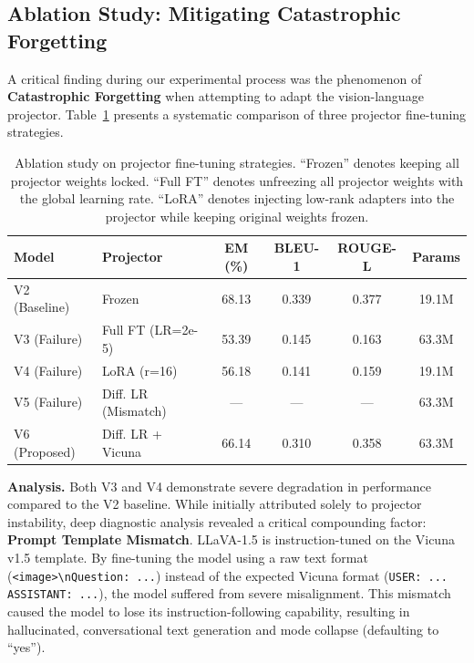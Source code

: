 \subsection{Ablation Study: Mitigating Catastrophic Forgetting}

A critical finding during our experimental process was the phenomenon of \textbf{Catastrophic Forgetting} when attempting to adapt the vision-language projector. Table~\ref{tab:ablation} presents a systematic comparison of three projector fine-tuning strategies.

\begin{table}[htbp]
\caption{Ablation study on projector fine-tuning strategies. ``Frozen'' denotes keeping all projector weights locked. ``Full FT'' denotes unfreezing all projector weights with the global learning rate. ``LoRA'' denotes injecting low-rank adapters into the projector while keeping original weights frozen.}
\label{tab:ablation}
\centering
\begin{tabular}{llcccc}
\toprule
\textbf{Model} & \textbf{Projector} & \textbf{EM (\%)} & \textbf{BLEU-1} & \textbf{ROUGE-L} & \textbf{Params} \\
\midrule
V2 (Baseline)  & Frozen             & 68.13 & 0.339 & 0.377 & 19.1M \\
V3 (Failure)   & Full FT (LR=2e-5)  & 53.39 & 0.145 & 0.163 & 63.3M \\
V4 (Failure)   & LoRA (r=16)        & 56.18 & 0.141 & 0.159 & 19.1M \\
V5 (Failure)   & Diff. LR (Mismatch)& ---   & ---   & ---   & 63.3M \\
V6 (Proposed)  & Diff. LR + Vicuna  & 66.14 & 0.310 & 0.358 & 63.3M \\
\bottomrule
\end{tabular}
\end{table}

\textbf{Analysis.} Both V3 and V4 demonstrate severe degradation in performance compared to the V2 baseline. While initially attributed solely to projector instability, deep diagnostic analysis revealed a critical compounding factor: \textbf{Prompt Template Mismatch}. LLaVA-1.5 is instruction-tuned on the Vicuna v1.5 template. By fine-tuning the model using a raw text format (\texttt{<image>\textbackslash nQuestion: ...}) instead of the expected Vicuna format (\texttt{USER: ... ASSISTANT: ...}), the model suffered from severe misalignment. This mismatch caused the model to lose its instruction-following capability, resulting in hallucinated, conversational text generation and mode collapse (defaulting to ``yes'').

